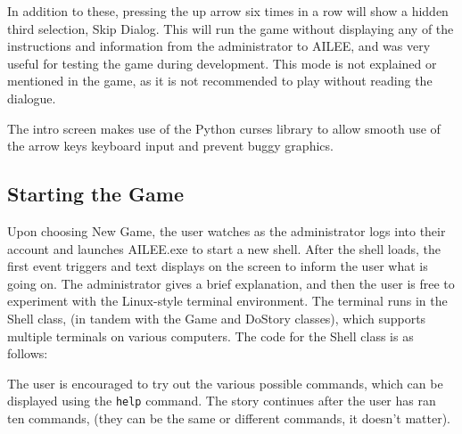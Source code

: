 \documentclass[conference]{IEEEtran}
\begin{document}
In addition to these, pressing the up arrow six times in a row will show a hidden third selection, Skip Dialog. This will run the game without displaying any of the instructions and information from the administrator to AILEE, and was very useful for testing the game during development. This mode is not explained or mentioned in the game, as it is not recommended to play without reading the dialogue.

The intro screen makes use of the Python curses library to allow smooth use of the arrow keys keyboard input and prevent buggy graphics.

\subsection{Starting the Game}
Upon choosing New Game, the user watches as the administrator logs into their account and launches AILEE.exe to start a new shell. After the shell loads, the first event triggers and text displays on the screen to inform the user what is going on. The administrator gives a brief explanation, and then the user is free to experiment with the Linux-style terminal environment. The terminal runs in the Shell class, (in tandem with the Game and DoStory classes), which supports multiple terminals on various computers. The code for the Shell class is as follows:



The user is encouraged to try out the various possible commands, which can be displayed using the \texttt{help} command. The story continues after the user has ran ten commands, (they can be the same or different commands, it doesn't matter).
\end{document}

